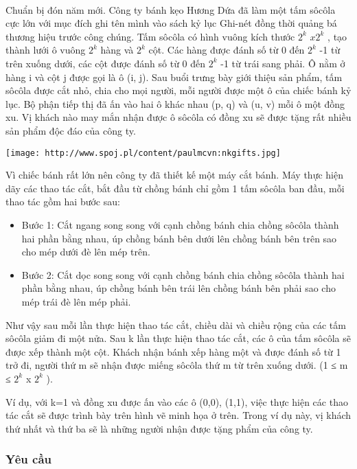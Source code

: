 

 

Chuẩn bị đón năm mới. Công ty bánh kẹo Hương Dứa đã làm một tấm sôcôla cực lớn với mục đích ghi tên mình vào sách kỷ lục Ghi-nét đồng thời quảng bá thương hiệu trước công chúng. Tấm sôcôla có hình vuông kích thước $2^{k}$ $x2^{k}$ , tạo thành lưới ô vuông $2^{k}$ hàng và $2^{k}$ cột. Các hàng được đánh số từ 0 đến $2^{k}$ -1 từ trên xuống dưới, các cột được đánh số từ 0 đến $2^{k}$ -1 từ trái sang phải. Ô nằm ở hàng i và cột j được gọi là ô (i, j). Sau buổi trưng bày giới thiệu sản phẩm, tấm sôcôla được cắt nhỏ, chia cho mọi người, mỗi người được một ô của chiếc bánh kỷ lục. Bộ phận tiếp thị đã ấn vào hai ô khác nhau (p, q) và (u, v) mỗi ô một đồng xu. Vị khách nào may mắn nhận được ô sôcôla có đồng xu sẽ được tặng rất nhiều sản phẩm độc đáo của công ty.


\texttt{[image: http://www.spoj.pl/content/paulmcvn:nkgifts.jpg]}

Vì chiếc bánh rất lớn nên công ty đã thiết kế một máy cắt bánh. Máy thực hiện dãy các thao tác cắt, bắt đầu từ chồng bánh chỉ gồm 1 tấm sôcôla ban đầu, mỗi thao tác gồm hai bước sau:
\begin{itemize}
	\item Bước 1: Cắt ngang song song với cạnh chồng bánh chia chồng sôcôla thành hai phần bằng nhau, úp chồng bánh bên dưới lên chồng bánh bên trên sao cho mép dưới đè lên mép trên.
	\item Bước 2: Cắt dọc song song với cạnh chồng bánh chia chồng sôcôla thành hai phần bằng nhau, úp chồng bánh bên trái lên chồng bánh bên phải sao cho mép trái đè lên mép phải.
\end{itemize}

Như vậy sau mỗi lần thực hiện thao tác cắt, chiều dài và chiều rộng của các tấm sôcôla giảm đi một nửa. Sau k lần thực hiện thao tác cắt, các ô của tấm sôcôla sẽ được xếp thành một cột. Khách nhận bánh xếp hàng một và được đánh số từ 1 trở đi, người thứ m sẽ nhận được miếng sôcôla thứ m từ trên xuống dưới. (1 ≤ m ≤ $2^{k}$ x $2^{k}$ ).

Ví dụ, với k=1 và đồng xu được ấn vào các ô (0,0), (1,1), việc thực hiện các thao tác cắt sẽ được trình bày trên hình vẽ minh họa ở trên. Trong ví dụ này, vị khách thứ nhất và thứ ba sẽ là những người nhận được tặng phẩm của công ty.

\subsubsection{Yêu cầu}

